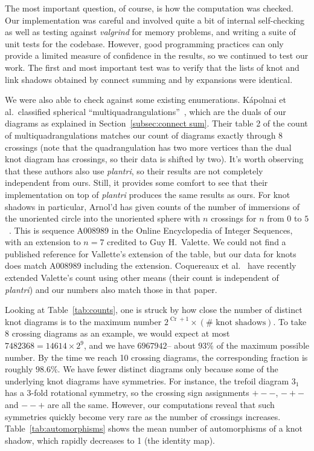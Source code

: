 \documentclass[amsmath,secnumarabic,floatfix,amssymb,nofootinbib,nobibnotes,letterpaper,11pt,tightenlines,showkeys]{revtex4}
\theoremstyle{definition}
\newcommand{\plantri}{\textit{plantri} }
\newcommand{\valgrind}{\textit{valgrind} }
\newcommand{\Cr}{\operatorname{Cr}}
\newcommand{\tref}{3_1}
\begin{document}
The most important question, of course, is how the computation was checked. Our implementation was careful and involved quite a bit of internal self-checking as well as testing against \valgrind for memory problems, and writing a suite of unit tests for the codebase. However, good programming practices can only provide a limited measure of confidence in the results, so we continued to test our work. The first and most important test was to verify that the lists of knot and link shadows obtained by connect summing and by expansions were identical. 

We were also able to check against some existing enumerations. K\'apolnai et al.\ classified spherical ``multiquadrangulations''~\cite{Kapolnai:2012hs}, which are the duals of our diagrams as explained in Section~\ref{subsec:connect sum}. Their table 2 of the count of multiquadrangulations matches our count of diagrams exactly through $8$ crossings (note that the quadrangulation has two more vertices than the dual knot diagram has crossings, so their data is shifted by two). It's worth observing that these authors also use \emph{plantri}, so their results are not completely independent from ours. Still, it provides some comfort to see that their implementation on top of \plantri produces the same results as ours. For knot shadows in particular, Arnol'd has given counts of the number of immersions of the unoriented circle into the unoriented sphere with $n$ crossings for $n$ from $0$ to $5$~\cite[page 79]{Arnold:1994wr}. This is sequence A008989 in the Online Encyclopedia of Integer Sequences, with an extension to $n=7$ credited to Guy H.\ Valette. We could not find a published reference for Vallette's extension of the table, but our data for knots does match A008989 including the extension.  Coquereaux et al.~\cite{Coquereaux:2015wv} have recently extended Valette's count using other means (their count is independent of \emph{plantri}) and our numbers also match those in that paper. 

Looking at Table~\ref{tab:counts}, one is struck by how close the number of distinct knot diagrams is to the maximum number $2^{\Cr+1} \times (\# \text{ knot shadows})$. To take 8 crossing diagrams as an example, we would expect at most $\num{7482368} =\num{14614} \times 2^9$, and we have $\num{6967942}$-- about $93\%$ of the maximum possible number. By the time we reach 10 crossing diagrams, the corresponding fraction is roughly $98.6\%$. We have fewer distinct diagrams only because some of the underlying knot diagrams have symmetries. For instance, the trefoil diagram $\tref$ has a 3-fold rotational symmetry, so the crossing sign assignments $+--$, $-+-$ and $--+$ are all the same. However, our computations reveal that such symmetries quickly become very rare as the number of crossings increases. Table~\ref{tab:automorphisms} shows the mean number of automorphisms of a knot shadow, which rapidly decreases to 1 (the identity map).
\end{document}
